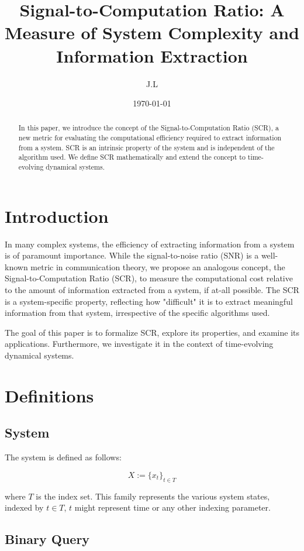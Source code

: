 \documentclass[11pt,a4paper]{article}
\title{Signal-to-Computation Ratio: A Measure of System Complexity and Information Extraction}
\author{J.L}
\date{\today}
\theoremstyle{definition}
\theoremstyle{remark}
\numberwithin{equation}{section}
\begin{document}
\maketitle

\begin{abstract}
In this paper, we introduce the concept of the Signal-to-Computation Ratio (SCR), a new metric for evaluating the computational efficiency required to extract information from a system. SCR is an intrinsic property of the system and is independent of the algorithm used. We define SCR mathematically and extend the concept to time-evolving dynamical systems.
\end{abstract}

\section{Introduction}
In many complex systems, the efficiency of extracting information from a system is of paramount importance. 
While the signal-to-noise ratio (SNR) is a well-known metric in communication theory, we propose an analogous concept, the Signal-to-Computation Ratio (SCR), to measure the computational cost relative to the amount of information extracted from a system, if at-all possible. 
The SCR is a system-specific property, reflecting how "difficult" it is to extract meaningful information from that system, irrespective of the specific algorithms used.

The goal of this paper is to formalize SCR, explore its properties, and examine its applications.
Furthermore, we investigate it  in the context of time-evolving dynamical systems. 

\section{Definitions}

\subsection{System}

The system is defined as follows:

\[
X := \{ x_t \}_{t \in T}
\]

where $T$ is the index set.
This family represents the various system states, indexed by $t\in T$, 
$t$ might represent time or any other indexing parameter.

\subsection{Binary Query}
\end{document}
